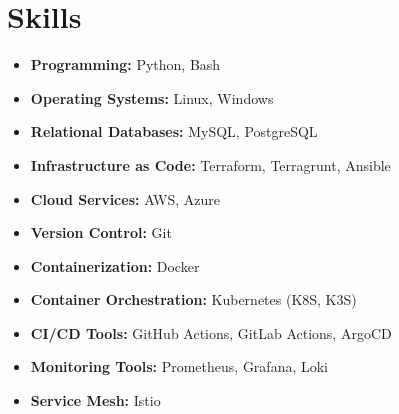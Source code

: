 \documentclass[a4paper,10pt]{article}
\begin{document}
\section*{Skills}
\begin{itemize}[leftmargin=0.5in]
    \item \textbf{Programming:} Python, Bash
    \item \textbf{Operating Systems:} Linux, Windows
    \item \textbf{Relational Databases:} MySQL, PostgreSQL
    \item \textbf{Infrastructure as Code:} Terraform, Terragrunt, Ansible
    \item \textbf{Cloud Services:} AWS, Azure
    \item \textbf{Version Control:} Git
    \item \textbf{Containerization:} Docker
    \item \textbf{Container Orchestration:} Kubernetes (K8S, K3S)
    \item \textbf{CI/CD Tools:} GitHub Actions, GitLab Actions, ArgoCD
    \item \textbf{Monitoring Tools:} Prometheus, Grafana, Loki
    \item \textbf{Service Mesh:} Istio
\end{itemize}

\vspace{10pt}
\end{document}
